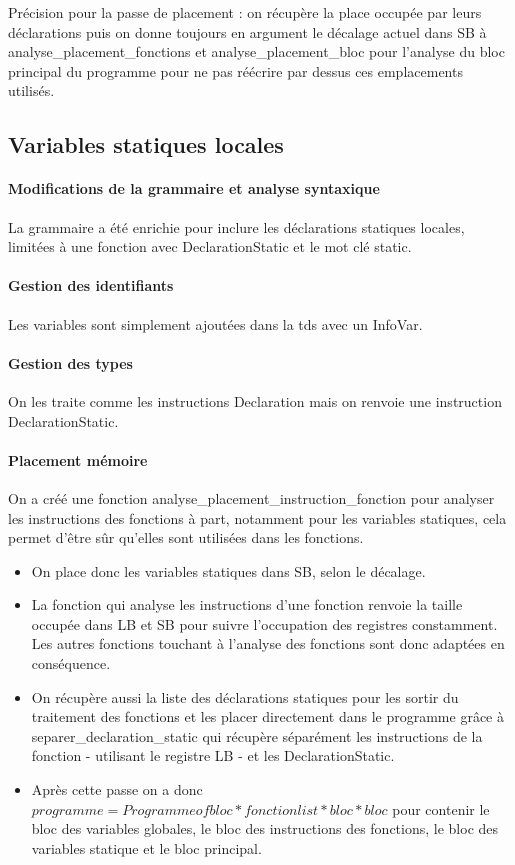 \documentclass[a4paper,12pt]{article}
\begin{document}
Précision pour la passe de placement : on récupère la place occupée par leurs déclarations puis on donne toujours en argument le décalage actuel dans SB à analyse\_placement\_fonctions et analyse\_placement\_bloc pour l'analyse du bloc principal du programme pour ne pas réécrire par dessus ces emplacements utilisés.

\subsection{Variables statiques locales}
\paragraph{Modifications de la grammaire et analyse syntaxique}
La grammaire a été enrichie pour inclure les déclarations statiques locales, limitées à une fonction avec DeclarationStatic et le mot clé static.

\paragraph{Gestion des identifiants}
Les variables sont simplement ajoutées dans la tds avec un InfoVar.

\paragraph{Gestion des types} On les traite comme les instructions Declaration mais on renvoie une instruction DeclarationStatic.

\paragraph{Placement mémoire}
On a créé une fonction analyse\_placement\_instruction\_fonction pour analyser les instructions des fonctions à part, notamment pour les variables statiques, cela permet d'être sûr qu'elles sont utilisées dans les fonctions.
\begin{itemize}
\item On place donc les variables statiques dans SB, selon le décalage.

\item La fonction qui analyse les instructions d'une fonction renvoie la taille occupée dans LB et SB pour suivre l'occupation des registres constamment. Les autres fonctions touchant à l'analyse des fonctions sont donc adaptées en conséquence.

\item On récupère aussi la liste des déclarations statiques pour les sortir du traitement des fonctions et les placer directement dans le programme grâce à separer\_declaration\_static qui récupère séparément les instructions de la fonction - utilisant le registre LB - et les DeclarationStatic.

\item Après cette passe on a donc $programme = Programme of bloc * fonction list * bloc * bloc$ pour contenir le bloc des variables globales, le bloc des instructions des fonctions, le bloc des variables statique et le bloc principal.
\end{itemize}
\end{document}
